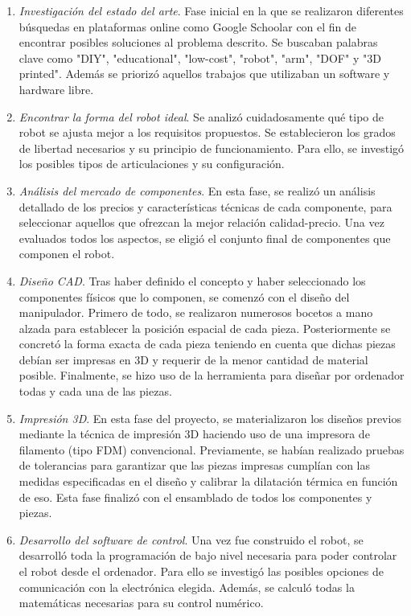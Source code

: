 \begin{enumerate}
\item \textit{Investigación del estado del arte}. Fase inicial en la que se realizaron diferentes
búsquedas en plataformas online como Google Schoolar con el fin de encontrar posibles soluciones al problema descrito. Se buscaban 
palabras clave como "DIY", "educational", "low-cost", "robot", "arm", "DOF" y "3D printed". Además se priorizó aquellos trabajos que utilizaban un 
software y hardware libre. 
\item \textit{Encontrar la forma del robot ideal}. Se analizó cuidadosamente qué tipo de robot se ajusta mejor a los requisitos propuestos. Se establecieron los 
grados de libertad necesarios y su principio de funcionamiento. Para ello, se investigó los posibles tipos de articulaciones y 
su configuración.

\item \textit{Análisis del mercado de componentes}. En esta fase, se realizó un análisis detallado de los precios y características 
técnicas de cada componente, para seleccionar aquellos que ofrezcan la mejor relación calidad-precio. Una vez evaluados todos los 
aspectos, se eligió el conjunto final de componentes que componen el robot.

\item \textit{Diseño CAD}. Tras haber definido el concepto y haber seleccionado los componentes físicos que lo componen, se comenzó con 
el diseño del manipulador. Primero de todo, se realizaron numerosos bocetos a mano alzada para establecer la posición espacial de cada 
pieza. Posteriormente se concretó la forma exacta de cada pieza teniendo en cuenta que dichas piezas debían ser impresas en 3D y requerir 
de la menor cantidad de material posible. Finalmente, se hizo uso de la herramienta  para diseñar por ordenador 
todas y cada una de las piezas.

\item \textit{Impresión 3D}. En esta fase del proyecto, se materializaron los diseños previos mediante la técnica de impresión 3D haciendo 
uso de una impresora de filamento (tipo \acs{FDM}) convencional. Previamente, se habían realizado pruebas de tolerancias para garantizar 
que las piezas impresas cumplían con las medidas especificadas en el diseño y calibrar la dilatación térmica en función de eso. Esta fase 
finalizó con el ensamblado de todos los componentes y piezas.

\item \textit{Desarrollo del software de control}. Una vez fue construido el robot, se desarrolló toda la programación de bajo nivel 
necesaria para poder controlar el robot desde el ordenador. Para ello se investigó las posibles opciones de comunicación con la electrónica elegida. Además,  
se calculó todas la matemáticas necesarias para su control numérico.


\end{enumerate}
